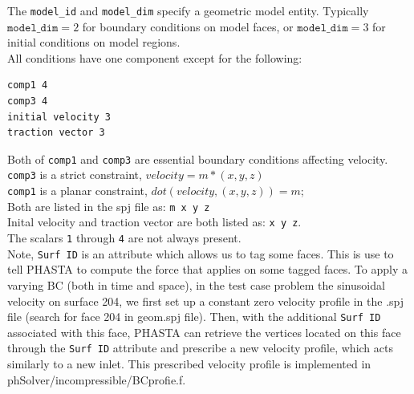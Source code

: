 \documentclass{article}
\begin{document}
The \texttt{model\_id} and \texttt{model\_dim} specify a geometric model entity. Typically $\texttt{model\_dim}=2$ for boundary conditions on model faces, or $\texttt{model\_dim}=3$ for initial conditions on model regions.\\
All conditions have one component except for the following:
\begin{lstlisting}
comp1 4 
comp3 4 
initial velocity 3 
traction vector 3 
\end{lstlisting}

Both of \texttt{comp1} and \texttt{comp3} are essential boundary conditions affecting velocity. \\
\texttt{comp3} is a strict constraint, $velocity = m*(x,y,z)$ \\
\texttt{comp1} is a planar constraint, $dot(velocity,(x,y,z)) = m$; \\
Both are listed in the spj file as: \texttt{m x y z} \\
Inital velocity and traction vector are both listed as: \texttt{x y z}. \\
The scalars \texttt{1} through \texttt{4} are not always present. \\
Note, \texttt{Surf ID} is an attribute which allows us to tag some faces. This is use to tell PHASTA to compute the force that applies on some tagged faces.
To apply a varying BC (both in time and space), in the test case problem the sinusoidal velocity on surface 204, we first set up a constant zero velocity profile in the .spj file (search for face 204 in geom.spj file). Then, with the additional \texttt{Surf ID} associated with this face, PHASTA can retrieve the vertices located on this face through the \texttt{Surf ID} attribute and prescribe a new velocity profile, which acts similarly to a new inlet. This prescribed velocity profile is implemented in phSolver/incompressible/BCprofie.f.
\end{document}
